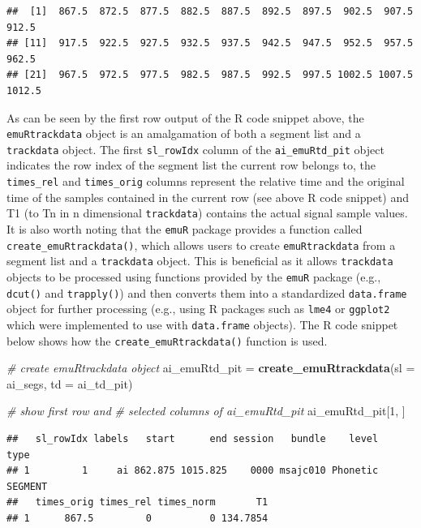 \documentclass[]{book}
\newenvironment{Shaded}{\begin{snugshade}}{\end{snugshade}}
\newcommand{\CommentTok}[1]{\textcolor[rgb]{0.56,0.35,0.01}{\textit{#1}}}
\newcommand{\DataTypeTok}[1]{\textcolor[rgb]{0.13,0.29,0.53}{#1}}
\newcommand{\DecValTok}[1]{\textcolor[rgb]{0.00,0.00,0.81}{#1}}
\newcommand{\KeywordTok}[1]{\textcolor[rgb]{0.13,0.29,0.53}{\textbf{#1}}}
\newcommand{\NormalTok}[1]{#1}
\newcommand{\StringTok}[1]{\textcolor[rgb]{0.31,0.60,0.02}{#1}}
\begin{document}
\begin{verbatim}
##  [1]  867.5  872.5  877.5  882.5  887.5  892.5  897.5  902.5  907.5  912.5
## [11]  917.5  922.5  927.5  932.5  937.5  942.5  947.5  952.5  957.5  962.5
## [21]  967.5  972.5  977.5  982.5  987.5  992.5  997.5 1002.5 1007.5 1012.5
\end{verbatim}

As can be seen by the first row output of the R code snippet above, the \texttt{emuRtrackdata} object is an amalgamation of both a segment list and a \texttt{trackdata} object. The first \texttt{sl\_rowIdx} column of the \texttt{ai\_emuRtd\_pit} object indicates the row index of the segment list the current row belongs to, the \texttt{times\_rel} and \texttt{times\_orig} columns represent the relative time and the original time of the samples contained in the current row (see above R code snippet) and T1 (to Tn in n dimensional \texttt{trackdata}) contains the actual signal sample values. It is also worth noting that the \texttt{emuR} package provides a function called \texttt{create\_emuRtrackdata()}, which allows users to create \texttt{emuRtrackdata} from a segment list and a \texttt{trackdata} object. This is beneficial as it allows \texttt{trackdata} objects to be processed using functions provided by the \texttt{emuR} package (e.g., \texttt{dcut()} and \texttt{trapply()}) and then converts them into a standardized \texttt{data.frame} object for further processing (e.g., using R packages such as \texttt{lme4} or \texttt{ggplot2} which were implemented to use with \texttt{data.frame} objects). The R code snippet below shows how the \texttt{create\_emuRtrackdata()} function is used.

\begin{Shaded}
\begin{Highlighting}[]
\CommentTok{# create emuRtrackdata object}
\NormalTok{ai_emuRtd_pit  =}\StringTok{ }\KeywordTok{create_emuRtrackdata}\NormalTok{(}\DataTypeTok{sl =}\NormalTok{ ai_segs,}
                                      \DataTypeTok{td =}\NormalTok{ ai_td_pit)}

\CommentTok{# show first row and}
\CommentTok{# selected columns of ai_emuRtd_pit}
\NormalTok{ai_emuRtd_pit[}\DecValTok{1}\NormalTok{, ]}
\end{Highlighting}
\end{Shaded}

\begin{verbatim}
##   sl_rowIdx labels   start      end session   bundle    level    type
## 1         1     ai 862.875 1015.825    0000 msajc010 Phonetic SEGMENT
##   times_orig times_rel times_norm       T1
## 1      867.5         0          0 134.7854
\end{verbatim}
\end{document}
